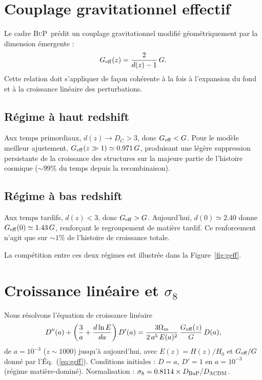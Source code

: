 \documentclass[11pt]{article}
\newcommand{\DC}{D_C}
\newcommand{\Geff}{G_{\rm eff}}
\newcommand{\sig}{\sigma_8}
\newcommand{\LCDM}{\Lambda\mathrm{CDM}}
\newcommand{\BuP}{\textsc{BuP}}
\begin{document}
\section{Couplage gravitationnel effectif}

Le cadre \BuP\ prédit un couplage gravitationnel modifié
géométriquement par la dimension émergente :
\begin{equation}
  \Geff(z) = \frac{2}{d(z)-1}\,G.
  \label{eq:geff}
\end{equation}
Cette relation doit s'appliquer de façon cohérente à la fois à
l'expansion du fond et à la croissance linéaire des perturbations.

\subsection*{Régime à haut redshift}

Aux temps primordiaux, $d(z) \to \DC > 3$, donc $\Geff < G$.
Pour le modèle meilleur ajustement, $\Geff(z \gg 1) \simeq 0.971\,G$, produisant
une légère suppression persistante de la croissance des structures
sur la majeure partie de l'histoire cosmique
(${\sim}99\%$ du temps depuis la recombinaison).

\subsection*{Régime à bas redshift}

Aux temps tardifs, $d(z) < 3$, donc $\Geff > G$.
Aujourd'hui, $d(0) \simeq 2.40$ donne $\Geff(0) \simeq 1.43\,G$,
renforçant le regroupement de matière tardif.
Ce renforcement n'agit que sur ${\sim}1\%$ de l'histoire de
croissance totale.

La compétition entre ces deux régimes est illustrée dans la
Figure~\ref{fig:geff}.

\section{Croissance linéaire et $\sigma_8$}

Nous résolvons l'équation de croissance linéaire
\begin{equation}
  D''(a)
  + \left(\frac{3}{a} + \frac{d\ln E}{da}\right) D'(a)
  = \frac{3\Omega_m}{2\,a^5\,E(a)^2}\,\frac{\Geff(z)}{G}\,D(a),
  \label{eq:growth}
\end{equation}
de $a = 10^{-3}$ ($z \sim 1000$) jusqu'à aujourd'hui, avec
$E(z) = H(z)/H_0$ et $\Geff/G$ donné par l'Éq.~(\ref{eq:geff}).
Conditions initiales : $D = a$, $D' = 1$ en $a = 10^{-3}$ (régime
matière-dominé). Normalisation : $\sig = 0.8114 \times
D_{\rm BuP}/D_{\LCDM}$.
\end{document}
